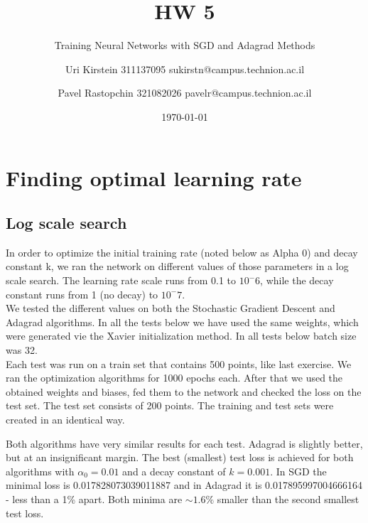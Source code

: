 \documentclass[12pt]{scrartcl}
\begin{document}

\titlehead{CS department, Technion}
\subject{Introduction to Optimization and Deep Learning 236330}
\title{HW 5}
\subtitle{Training Neural Networks with SGD and Adagrad Methods}
\author{Uri Kirstein 311137095 \hfill sukirstn@campus.technion.ac.il\and Pavel Rastopchin 321082026 pavelr@campus.technion.ac.il}
\date{\today}
\maketitle


\section{Finding optimal learning rate}
\subsection{Log scale search}
In order to optimize the initial training rate (noted below as Alpha 0) and decay constant k, we ran the network on different values of those parameters in a log scale search. The learning rate scale runs from 0.1 to $10^-6$, while the decay constant runs from 1 (no decay) to $10^-7$.\\

We tested the different values on both the Stochastic Gradient Descent and Adagrad algorithms. In all the tests below we have used the same weights, which were generated vie the Xavier initialization method. In all tests below batch size was 32.\\
Each test was run on a train set that contains 500 points, like last exercise. We ran the optimization algorithms for 1000 epochs each. After that we used the obtained weights and biases, fed them to the network and checked the loss on the test set. The test set consists of 200 points. The training and test sets were created in an identical way.



Both algorithms have very similar results for each test. Adagrad is slightly better, but at an insignificant margin. The best (smallest) test loss is achieved for both algorithms with $\alpha_0 = 0.01$ and a decay constant of $k=0.001$. In SGD the minimal loss is 0.017828073039011887 and in Adagrad it is 0.017895997004666164 - less than a 1\% apart. Both minima are $\sim 1.6\%$ smaller than the second smallest test loss.\\
\end{document}
